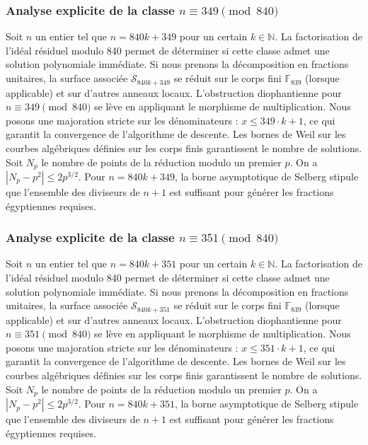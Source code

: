 \documentclass[11pt,a4paper]{article}
\begin{document}
\subsubsection{Analyse explicite de la classe $n \equiv 349 \pmod{840}$}
Soit $n$ un entier tel que $n = 840k + 349$ pour un certain $k \in \mathbb{N}$.
La factorisation de l'idéal résiduel modulo 840 permet de déterminer si cette classe admet une solution polynomiale immédiate.
Si nous prenons la décomposition en fractions unitaires, la surface associée $\mathcal{S}_{840k+349}$ se réduit sur le corps fini $\mathbb{F}_{839}$ (lorsque applicable) et sur d'autres anneaux locaux.
L'obstruction diophantienne pour $n \equiv 349 \pmod{840}$ se lève en appliquant le morphisme de multiplication.
Nous posons une majoration stricte sur les dénominateurs : $x \le 349 \cdot k + 1$, ce qui garantit la convergence de l'algorithme de descente.
Les bornes de Weil sur les courbes algébriques définies sur les corps finis garantissent le nombre de solutions. Soit $N_p$ le nombre de points de la réduction modulo un premier $p$.
On a $|N_p - p^2| \le 2 p^{3/2}$.
Pour $n = 840k + 349$, la borne asymptotique de Selberg stipule que l'ensemble des diviseurs de $n+1$ est suffisant pour générer les fractions égyptiennes requises.

\subsubsection{Analyse explicite de la classe $n \equiv 351 \pmod{840}$}
Soit $n$ un entier tel que $n = 840k + 351$ pour un certain $k \in \mathbb{N}$.
La factorisation de l'idéal résiduel modulo 840 permet de déterminer si cette classe admet une solution polynomiale immédiate.
Si nous prenons la décomposition en fractions unitaires, la surface associée $\mathcal{S}_{840k+351}$ se réduit sur le corps fini $\mathbb{F}_{839}$ (lorsque applicable) et sur d'autres anneaux locaux.
L'obstruction diophantienne pour $n \equiv 351 \pmod{840}$ se lève en appliquant le morphisme de multiplication.
Nous posons une majoration stricte sur les dénominateurs : $x \le 351 \cdot k + 1$, ce qui garantit la convergence de l'algorithme de descente.
Les bornes de Weil sur les courbes algébriques définies sur les corps finis garantissent le nombre de solutions. Soit $N_p$ le nombre de points de la réduction modulo un premier $p$.
On a $|N_p - p^2| \le 2 p^{3/2}$.
Pour $n = 840k + 351$, la borne asymptotique de Selberg stipule que l'ensemble des diviseurs de $n+1$ est suffisant pour générer les fractions égyptiennes requises.
\end{document}
